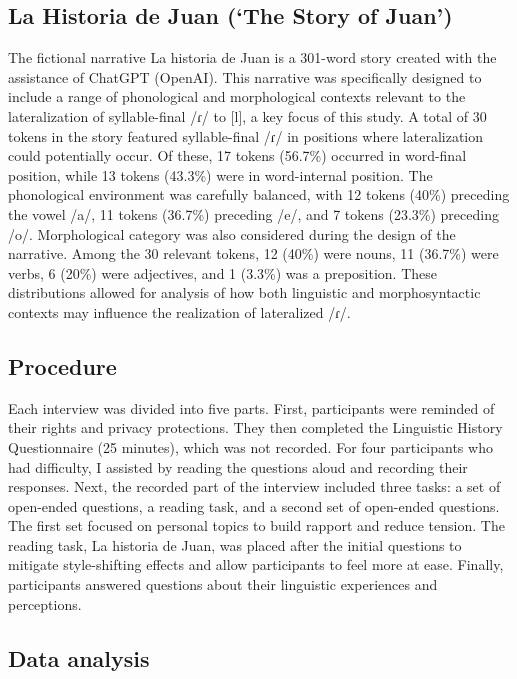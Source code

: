 \documentclass[
  man]{apa6}
\begin{document}
\subsection{La Historia de Juan (`The Story of Juan')}\label{la-historia-de-juan-the-story-of-juan}

The fictional narrative La historia de Juan is a 301-word story created with the assistance of ChatGPT (OpenAI). This narrative was specifically designed to include a range of phonological and morphological contexts relevant to the lateralization of syllable-final /ɾ/ to {[}l{]}, a key focus of this study.
A total of 30 tokens in the story featured syllable-final /ɾ/ in positions where lateralization could potentially occur. Of these, 17 tokens (56.7\%) occurred in word-final position, while 13 tokens (43.3\%) were in word-internal position. The phonological environment was carefully balanced, with 12 tokens (40\%) preceding the vowel /a/, 11 tokens (36.7\%) preceding /e/, and 7 tokens (23.3\%) preceding /o/.
Morphological category was also considered during the design of the narrative. Among the 30 relevant tokens, 12 (40\%) were nouns, 11 (36.7\%) were verbs, 6 (20\%) were adjectives, and 1 (3.3\%) was a preposition. These distributions allowed for analysis of how both linguistic and morphosyntactic contexts may influence the realization of lateralized /ɾ/.

\subsection{Procedure}\label{procedure}

Each interview was divided into five parts. First, participants were reminded of their rights and privacy protections. They then completed the Linguistic History Questionnaire (25 minutes), which was not recorded. For four participants who had difficulty, I assisted by reading the questions aloud and recording their responses.
Next, the recorded part of the interview included three tasks: a set of open-ended questions, a reading task, and a second set of open-ended questions. The first set focused on personal topics to build rapport and reduce tension. The reading task, La historia de Juan, was placed after the initial questions to mitigate style-shifting effects and allow participants to feel more at ease. Finally, participants answered questions about their linguistic experiences and perceptions.

\subsection{Data analysis}\label{data-analysis}
\end{document}
